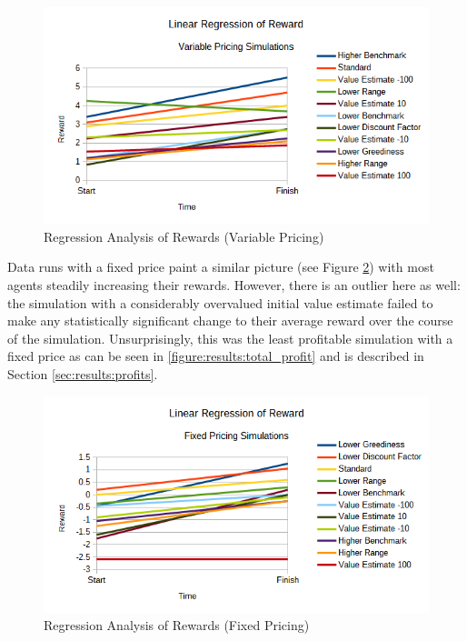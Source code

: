 \begin{figure}
\begin{center}
  \includegraphics[width=\textwidth]{../figures/reward_regression_variable}
  \caption{
    Regression Analysis of Rewards (Variable Pricing)
    \label{figure:results:variable_rewards}
  }
\end{center}
\end{figure}

Data runs with a fixed price paint a similar picture (see Figure
\ref{figure:results:fixed_rewards}) with most agents steadily increasing their
rewards. However, there is an outlier here as well: the simulation with a
considerably overvalued initial value estimate failed to make any statistically
significant change to their average reward over the course of the simulation.
Unsurprisingly, this was the least profitable simulation with a fixed price as
can be seen in \ref{figure:results:total_profit} and is described in Section
\ref{sec:results:profits}.

\begin{figure}
\begin{center}
  \includegraphics[width=\textwidth]{../figures/reward_regression_fixed}
  \caption{
    Regression Analysis of Rewards (Fixed Pricing)
    \label{figure:results:fixed_rewards}
  }
\end{center}
\end{figure}

